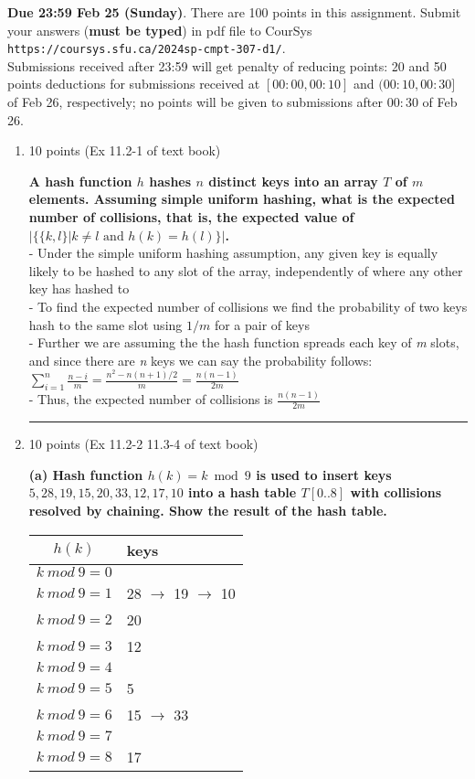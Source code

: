 \documentclass[letterpaper,12pt]{article}
\begin{document}

\pagestyle{myheadings}

\noindent
{\bf Due 23:59 Feb 25 (Sunday)}. There are 100 points in this assignment. 
Submit your answers ({\bf must be typed}) in pdf file to CourSys\\
{\tt https://coursys.sfu.ca/2024sp-cmpt-307-d1/}.\\
Submissions received after 23:59 will get penalty of reducing points: 20 and 50 points
deductions for submissions received at $[00:00,00:10]$ and $(00:10,00:30]$ of Feb 26,
respectively; no points will be given to submissions after $00:30$ of Feb 26.

 
\begin{enumerate}
\item 10 points (Ex 11.2-1 of text book)

\textbf{A hash function $h$ hashes $n$ distinct keys into an array $T$ of $m$ elements.
Assuming simple uniform hashing, what is the expected number of collisions, that
is, the expected value of $|\{\{k,l\}|k\neq l \mbox{ and } h(k)=h(l)\}|$.} \\
- Under the simple uniform hashing assumption, any given key is equally likely to be hashed to any slot of the array, independently of where any other key has hashed to \\
- To find the expected number of collisions we find the probability of two keys hash to the same slot using \(1/m\) for a pair of keys \\
- Further we are assuming the the hash function spreads each key of \textit{m} slots, and since there are \textit{n} keys we can say the probability follows: \(\sum_{i=1}^n \frac{n-i}{m} = \frac{n^2 - n(n+1)/2}{m} = \frac{n(n-1)}{2m} \) \\
- Thus, the expected number of collisions is \(\frac{n(n-1)}{2m}\)
\\ \noindent\rule{16cm}{0.1pt}

\item 10 points (Ex 11.2-2 11.3-4 of text book)

\textbf{(a) Hash function $h(k)=k \bmod 9$ is used to insert keys $5,28,19,15,20,33,12,17,10$
into a hash table $T[0..8]$ with collisions resolved by chaining. Show the
result of the hash table.} \\

\begin{tabular}{c|l}
$h(k)$ & keys \\ \hline
$k \ mod \ 9 = 0$ & \\
$k \ mod \ 9 = 1$ & 28 $\rightarrow$ 19 $\rightarrow$ 10 \\
$k \ mod \ 9 = 2$ & 20 \\
$k \ mod \ 9 = 3$ & 12 \\
$k \ mod \ 9 = 4$ & \\
$k \ mod \ 9 = 5$ & 5 \\
$k \ mod \ 9 = 6$ & 15 $\rightarrow$ 33 \\
$k \ mod \ 9 = 7$ & \\
$k \ mod \ 9 = 8$ & 17 \\
\end{tabular}


\end{enumerate}
\end{document}
